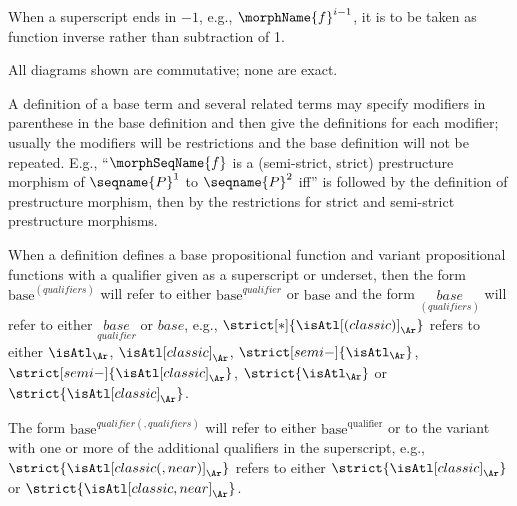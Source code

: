 \documentclass{article}
\begin{document}
When a superscript ends in $-1$, e.g., $\morphName{f}^{i-1}$, it is to be
taken as function inverse rather than subtraction of 1.

All diagrams shown are commutative; none are exact.

A definition of a base term and several related terms may specify
modifiers in parenthese in the base definition and then give the
definitions for each modifier; usually the modifiers will be
restrictions and the base definition will not be repeated.  E.g.,
{\textquotedblleft}$\morphSeqName{f}$ is a (semi-strict, strict)
prestructure morphism of $\seqname{P}^1$ to $\seqname{P}^2$
iff{\textquotedblright} is followed by the definition of prestructure
morphism, then by the restrictions for strict and semi-strict
prestructure morphisms.

When a definition defines a base propositional function and variant
propositional functions with a qualifier given as a superscript or
underset, then the form $\mathrm{base}^{(qualifiers)}$ will refer to
either $\mathrm{base}^{qualifier}$ or $\mathrm{base}$ and the form
$\underset{(qualifiers)}{base}$ will refer to either
$\underset{qualifier}{base}$ or $base$, e.g.,
$\strict[*]{\isAtl[(classic)]_\Ar}$ refers to either $\isAtl_\Ar$,
$\isAtl[classic]_\Ar$, $\strict[semi-]{\isAtl_\Ar}$,
$\strict[semi-]{\isAtl[classic]_\Ar}$, $\strict{\isAtl_\Ar}$ or
$\strict{\isAtl[classic]_\Ar}$.

The form $\mathrm{base}^{qualifier(,qualifiers)}$ will refer to either
$\mathrm{base}^{\mathrm{qualifier}}$ or to the variant with one or more
of the additional qualifiers in the superscript, e.g.,
$\strict{\isAtl[classic(,near)]_\Ar}$ refers to either
$\strict{\isAtl[classic]_\Ar}$ or
$\strict{\isAtl[classic,near]_\Ar}$.
\end{document}
